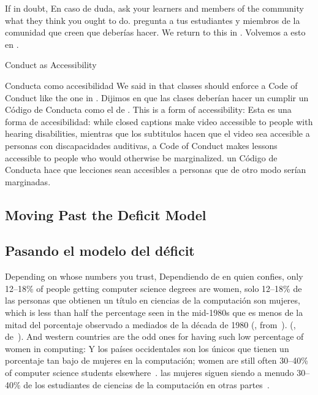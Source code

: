 If in doubt,
En caso de duda,
ask your learners and members of the community what they think you ought to do.
pregunta a tus estudiantes y miembros de la comunidad que creen que deberías hacer.
We return to this in .
Volvemos a esto en .

\begin{aside}{Conduct as Accessibility}
\begin{aside}{Conducta como accesibilidad}
  We said in  that classes should enforce a Code of Conduct like the one in .
  Dijimos en  que las clases deberían hacer un cumplir un Código de Conducta como el de .
  This is a form of accessibility:
  Esta es una forma de accesibilidad:
  while closed captions make video accessible to people with hearing disabilities,
  mientras que los subtitulos hacen que el video sea accesible a personas con discapacidades auditivas,
  a Code of Conduct makes lessons accessible to people who would otherwise be marginalized.
  un Código de Conducta hace que lecciones sean accesibles a personas que de otro modo serían marginadas.
\end{aside}

\subsection*{Moving Past the Deficit Model}
\subsection*{Pasando el modelo del déficit}

Depending on whose numbers you trust,
Dependiendo de en quien confies,
only 12--18\% of people getting computer science degrees are women,
solo 12--18\% de las personas que obtienen un título en ciencias de la computación son mujeres,
which is less than half the percentage seen in the mid-1980s
que es menos de la mitad del porcentaje observado a mediados de la década de 1980
(, from~\cite{Robe2017}).
(, de~\cite{Robe2017}).
And western countries are the odd ones for having such low percentage of women in computing:
Y los países occidentales son los únicos que tienen un porcentaje tan bajo de mujeres en la computación;
women are still often 30--40\% of computer science students elsewhere~\cite{Galp2002,Varm2015}.
las mujeres siguen siendo a menudo 30--40\% de los estudiantes de ciencias de la computación en otras partes~\cite{Galp2002,Varm2015}.


\end{aside}
